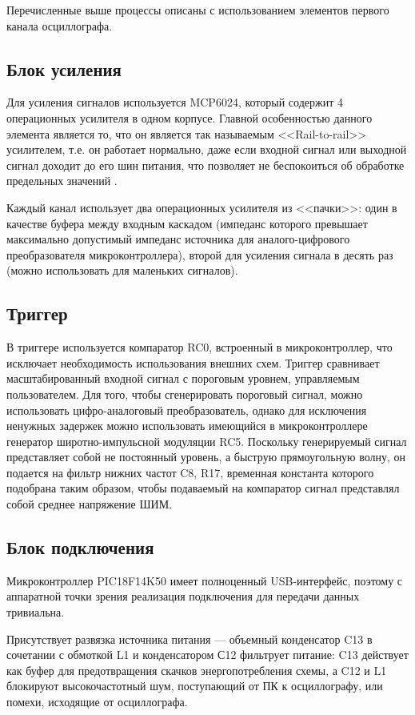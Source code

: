 Перечисленные выше процессы описаны с использованием элементов первого канала осциллографа.

\subsection{Блок усиления}

Для усиления сигналов используется MCP6024, который содержит 4 операционных усилителя в одном корпусе. Главной особенностью данного элемента является то, что он является так называемым <<Rail-to-rail>> усилителем, т.е. он работает нормально, даже если входной сигнал или выходной сигнал доходит до его шин питания, что позволяет не беспокоиться об обработке предельных значений \cite{mpc6024}.

Каждый канал использует два операционных усилителя из <<пачки>>: один в качестве буфера между входным каскадом (импеданс которого превышает максимально допустимый импеданс источника для аналого-цифрового преобразователя микроконтроллера), второй для усиления сигнала в десять раз (можно использовать для маленьких сигналов).

\subsection{Триггер}

В триггере используется компаратор RC0, встроенный в микроконтроллер, что исключает необходимость использования внешних схем.
Триггер сравнивает масштабированный входной сигнал с пороговым уровнем, управляемым пользователем.
Для того, чтобы сгенерировать пороговый сигнал, можно использовать цифро-аналоговый преобразователь, однако для исключения ненужных задержек можно использовать имеющийся в микроконтроллере генератор широтно-импульсной модуляции RC5. Поскольку генерируемый сигнал представляет собой не постоянный уровень, а быструю прямоугольную волну, он подается на фильтр нижних частот C8, R17, временная константа которого подобрана таким образом, чтобы подаваемый на компаратор сигнал представлял собой среднее напряжение ШИМ.

\subsection{Блок подключения}

Микроконтроллер PIC18F14K50 имеет полноценный USB-интерфейс, поэтому с аппаратной точки зрения реализация подключения для передачи данных тривиальна.

Присутствует развязка источника питания — объемный конденсатор C13 в сочетании с обмоткой L1 и конденсатором С12 фильтрует питание: 
C13 действует как буфер для предотвращения скачков энергопотребления схемы, 
а C12 и L1 блокируют высокочастотный шум, поступающий от ПК к осциллографу, 
или помехи, исходящие от осциллографа.